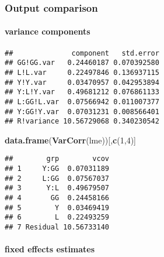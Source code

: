 \documentclass[]{article}
\newenvironment{Shaded}{\begin{snugshade}}{\end{snugshade}}
\newcommand{\KeywordTok}[1]{\textcolor[rgb]{0.13,0.29,0.53}{\textbf{#1}}}
\newcommand{\DataTypeTok}[1]{\textcolor[rgb]{0.13,0.29,0.53}{#1}}
\newcommand{\DecValTok}[1]{\textcolor[rgb]{0.00,0.00,0.81}{#1}}
\newcommand{\OperatorTok}[1]{\textcolor[rgb]{0.81,0.36,0.00}{\textbf{#1}}}
\newcommand{\NormalTok}[1]{#1}
\let\oldparagraph\paragraph
\renewcommand{\paragraph}[1]{\oldparagraph{#1}\mbox{}}
\begin{document}
\subsubsection{Output comparison}\label{output-comparison}

\paragraph{variance components}\label{variance-components}

\begin{Shaded}
\end{Shaded}

\begin{verbatim}
##              component   std.error
## GG!GG.var   0.24460187 0.070392580
## L!L.var     0.22497846 0.136937115
## Y!Y.var     0.03470957 0.042953894
## Y:L!Y.var   0.49681212 0.076861133
## L:GG!L.var  0.07566942 0.011007377
## Y:GG!Y.var  0.07031231 0.008566401
## R!variance 10.56729068 0.340230542
\end{verbatim}

\begin{Shaded}
\begin{Highlighting}[]
\KeywordTok{data.frame}\NormalTok{(}\KeywordTok{VarCorr}\NormalTok{(lme))[,}\KeywordTok{c}\NormalTok{(}\DecValTok{1}\NormalTok{,}\DecValTok{4}\NormalTok{)]}
\end{Highlighting}
\end{Shaded}

\begin{verbatim}
##        grp        vcov
## 1     Y:GG  0.07031189
## 2     L:GG  0.07567037
## 3      Y:L  0.49679507
## 4       GG  0.24458166
## 5        Y  0.03469419
## 6        L  0.22493259
## 7 Residual 10.56733140
\end{verbatim}

\paragraph{fixed effects estimates}\label{fixed-effects-estimates}

\begin{Shaded}
\end{Shaded}
\end{document}
